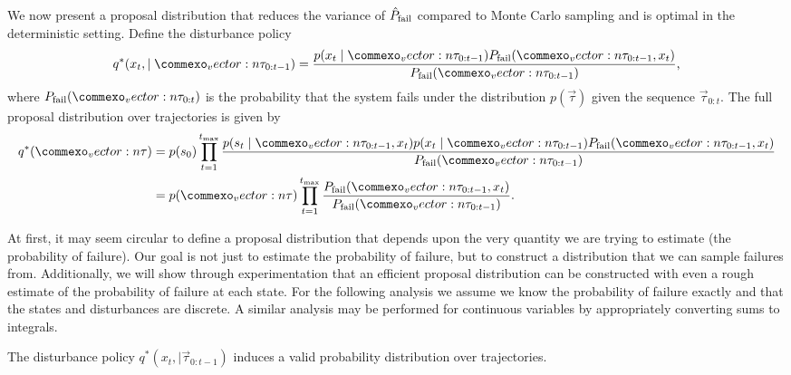 We now present a proposal distribution that reduces the variance of $\hat{P}_{\rm fail}$ compared to Monte Carlo sampling and is optimal in the deterministic setting. Define the disturbance policy
\begin{equation}
    q^*(x_t, \mid \vec{\tau}_{0:t-1}) = \frac{p(x_t \mid \vec{\tau}_{0:t-1}) P_{\rm fail}(\vec{\tau}_{0:t-1}, x_t)}{P_{\rm fail}(\vec{\tau}_{0:t-1})} \text{,} \label{eq:disturbance_policy}
\end{equation}
where $P_{\rm fail}(\vec{\tau}_{0:t})$ is the probability that the system fails under the distribution $p(\vec{\tau})$ given the sequence $\vec{\tau}_{0:t}$. The full proposal distribution over trajectories is given by 
\begin{align}
    q^*(\vec{\tau}) &= p(s_0) \prod_{t=1}^{t_{\rm max}} \frac{p(s_t \mid \vec{\tau}_{0:t-1}, x_t)  p(x_t \mid \vec{\tau}_{0:t-1}) P_{\rm fail}(\vec{\tau}_{0:t-1}, x_t)}{P_{\rm fail}(\vec{\tau}_{0:t-1})} \\
    &= p(\vec{\tau}) \prod_{t=1}^{t_{\rm max}} \frac{P_{\rm fail}(\vec{\tau}_{0:t-1}, x_t)}{P_{\rm fail}(\vec{\tau}_{0:t-1})} \text{.} \label{eq:full_proposal}
\end{align}

At first, it may seem circular to define a proposal distribution that depends upon the very quantity we are trying to estimate (the probability of failure). Our goal is not just to estimate the probability of failure, but to construct a distribution that we can sample failures from.  Additionally, we will show through experimentation that an efficient proposal distribution can be constructed with even a rough estimate of the probability of failure at each state. For the following analysis we assume we know the probability of failure exactly and that the states and disturbances are discrete. A similar analysis may be performed for continuous variables by appropriately converting sums to integrals.

\begin{proposition} 
The disturbance policy $q^*(x_t, \mid \vec{\tau}_{0:t-1})$ induces a valid probability distribution over trajectories.
\end{proposition}

